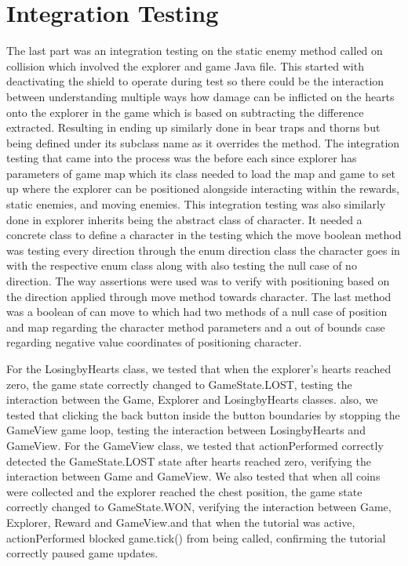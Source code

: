 \documentclass[12pt,letterpaper]{article}
\begin{document}
\section{Integration Testing}
The last part was an integration testing on the static enemy method called on collision which involved the explorer and game Java file. This started with deactivating the shield to operate during test so there could be the interaction between understanding multiple ways how damage can be inflicted on the hearts onto the explorer in the game which is based on subtracting the difference extracted. Resulting in ending up similarly done in bear traps and thorns but being defined under its subclass name as it overrides the method. The integration testing that came into  the process was the before each since explorer has parameters of game map which its class needed to load the map and game to set up where the explorer can be positioned alongside interacting within the rewards, static enemies, and moving enemies. This integration testing was also similarly done in explorer inherits being the abstract class of character. It needed a concrete class to define a character in the testing which the move boolean method was testing every direction through the enum direction class the character goes in with the respective enum class along with also testing the null case of no direction. The way assertions were used was to verify with positioning based on the direction applied through move method towards character. The last method was a boolean of can move to which had two methods of a null case of position and map regarding the character method parameters and a out of bounds case regarding negative value coordinates of positioning character. 

For the LosingbyHearts class, we tested that when the explorer's hearts reached zero, the game state correctly changed to GameState.LOST, testing the interaction between the Game, Explorer and LosingbyHearts classes. also, we tested that clicking the back button inside the button boundaries by stopping the GameView game loop, testing the interaction between LosingbyHearts and GameView.
For the GameView class, we tested that actionPerformed correctly detected the GameState.LOST state after hearts reached zero, verifying the interaction between Game and GameView. We also tested that when all coins were collected and the explorer reached the chest position, the game state correctly changed to GameState.WON, verifying the interaction between Game, Explorer, Reward and GameView.and that when the tutorial was active, actionPerformed blocked game.tick() from being called, confirming the tutorial correctly paused game updates.
\end{document}

